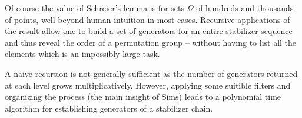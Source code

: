 \documentclass[12pt]{article}
\begin{document}
Of course the value of Schreier's lemma is for sets $\Omega$ of hundreds and thousands of points, well beyond human intuition in most cases.  Recursive applications of the result allow one to build a set of generators for an entire stabilizer sequence and thus reveal the order of a permutation group -- without having to list all the elements which is an impossibly large task.  

A naive recursion is not generally sufficient as the number of generators returned at each level grows multiplicatively.  However, applying some suitible filters and organizing the process (the main insight of Sims) leads to a polynomial time algorithm for establishing generators of a stabilizer chain.
\end{document}
